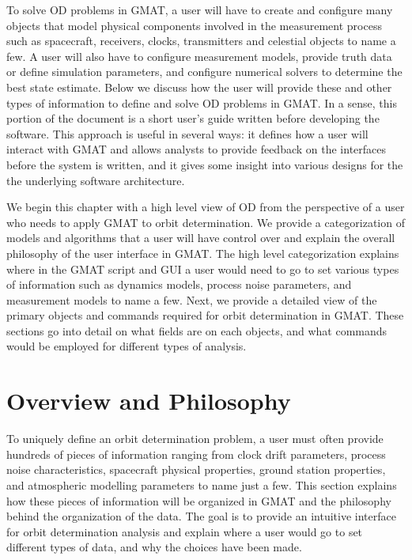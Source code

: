 
To solve OD problems in GMAT, a user will have to create and
configure many objects that model physical components involved in
the measurement process such as spacecraft, receivers, clocks,
transmitters and celestial objects to name a few.  A user will also
have to configure measurement models, provide truth data or define
simulation parameters, and configure numerical solvers to determine
the best state estimate. Below we discuss how the user will provide
these and other types of information to define and solve OD problems
in GMAT.  In a sense, this portion of the document is a  short
user's guide  written before developing the software. This approach
is useful in several ways: it defines how a user will interact with
GMAT and allows analysts to provide feedback on the interfaces
before the system is written, and it gives some insight into various
designs for the the underlying software architecture.

We begin this chapter with a high level view of OD from the
perspective of a user who needs to apply GMAT to orbit
determination. We provide a categorization of models and algorithms
that a user will have control over and explain the overall
philosophy of the user interface in GMAT.  The high level
categorization explains where in the GMAT script and GUI a user
would need to go to set various types of information such as
dynamics models, process noise parameters, and measurement models to
name a few.  Next, we provide a detailed view of the primary objects
and commands required for orbit determination in GMAT.  These
sections go into detail on what fields are on each objects, and what
commands would be employed for different types of analysis.

\section{Overview and Philosophy}

To uniquely define an orbit determination problem, a user must often
provide hundreds of pieces of information ranging from clock drift
parameters, process noise characteristics, spacecraft physical
properties, ground station properties, and atmospheric modelling
parameters to name just a few. This section explains how these
pieces of information will be organized in GMAT and the philosophy
behind the organization of the data.  The goal is to provide an
intuitive interface for orbit determination analysis and explain
where a user would go to set different types of data, and why the
choices have been made.

